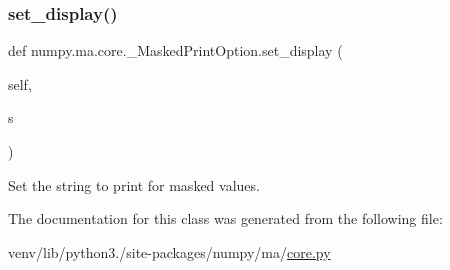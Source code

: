 \subsubsection{\texorpdfstring{set\+\_\+display()}{set\_display()}}
{\footnotesize\ttfamily def numpy.\+ma.\+core.\+\_\+\+Masked\+Print\+Option.\+set\+\_\+display (\begin{DoxyParamCaption}\item[{}]{self,  }\item[{}]{s }\end{DoxyParamCaption})}

\begin{DoxyVerb}Set the string to print for masked values.\end{DoxyVerb}
 

The documentation for this class was generated from the following file\+:\begin{DoxyCompactItemize}
\item 
venv/lib/python3./site-\/packages/numpy/ma/\hyperlink{numpy_2ma_2core_8py}{core.\+py}\end{DoxyCompactItemize}
